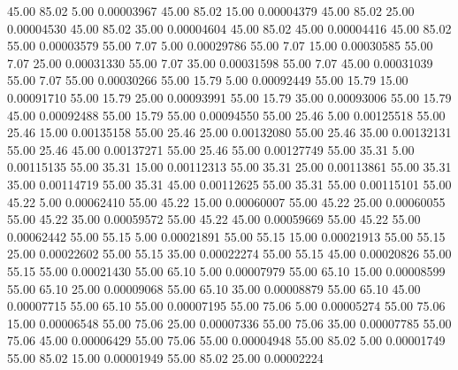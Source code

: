      45.00     85.02      5.00     0.00003967
     45.00     85.02     15.00     0.00004379
     45.00     85.02     25.00     0.00004530
     45.00     85.02     35.00     0.00004604
     45.00     85.02     45.00     0.00004416
     45.00     85.02     55.00     0.00003579
     55.00      7.07      5.00     0.00029786
     55.00      7.07     15.00     0.00030585
     55.00      7.07     25.00     0.00031330
     55.00      7.07     35.00     0.00031598
     55.00      7.07     45.00     0.00031039
     55.00      7.07     55.00     0.00030266
     55.00     15.79      5.00     0.00092449
     55.00     15.79     15.00     0.00091710
     55.00     15.79     25.00     0.00093991
     55.00     15.79     35.00     0.00093006
     55.00     15.79     45.00     0.00092488
     55.00     15.79     55.00     0.00094550
     55.00     25.46      5.00     0.00125518
     55.00     25.46     15.00     0.00135158
     55.00     25.46     25.00     0.00132080
     55.00     25.46     35.00     0.00132131
     55.00     25.46     45.00     0.00137271
     55.00     25.46     55.00     0.00127749
     55.00     35.31      5.00     0.00115135
     55.00     35.31     15.00     0.00112313
     55.00     35.31     25.00     0.00113861
     55.00     35.31     35.00     0.00114719
     55.00     35.31     45.00     0.00112625
     55.00     35.31     55.00     0.00115101
     55.00     45.22      5.00     0.00062410
     55.00     45.22     15.00     0.00060007
     55.00     45.22     25.00     0.00060055
     55.00     45.22     35.00     0.00059572
     55.00     45.22     45.00     0.00059669
     55.00     45.22     55.00     0.00062442
     55.00     55.15      5.00     0.00021891
     55.00     55.15     15.00     0.00021913
     55.00     55.15     25.00     0.00022602
     55.00     55.15     35.00     0.00022274
     55.00     55.15     45.00     0.00020826
     55.00     55.15     55.00     0.00021430
     55.00     65.10      5.00     0.00007979
     55.00     65.10     15.00     0.00008599
     55.00     65.10     25.00     0.00009068
     55.00     65.10     35.00     0.00008879
     55.00     65.10     45.00     0.00007715
     55.00     65.10     55.00     0.00007195
     55.00     75.06      5.00     0.00005274
     55.00     75.06     15.00     0.00006548
     55.00     75.06     25.00     0.00007336
     55.00     75.06     35.00     0.00007785
     55.00     75.06     45.00     0.00006429
     55.00     75.06     55.00     0.00004948
     55.00     85.02      5.00     0.00001749
     55.00     85.02     15.00     0.00001949
     55.00     85.02     25.00     0.00002224
